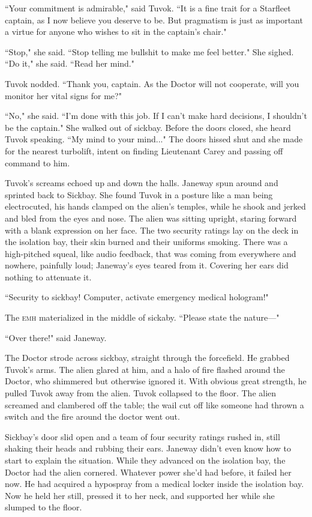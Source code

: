 \documentclass[twoside,letterpaper,12pt]{memoir}
\begin{document}
``Your commitment is admirable," said Tuvok. ``It is a fine trait for a Starfleet captain, as I now believe you deserve to be. But pragmatism is just as important a virtue for anyone who wishes to sit in the captain's chair." 

``Stop," she said. ``Stop telling me bullshit to make me feel better." She sighed. ``Do it," she said. ``Read her mind." 

Tuvok nodded. ``Thank you, captain. As the Doctor will not cooperate, will you monitor her vital signs for me?" 

``No," she said. ``I'm done with this job. If I can't make hard decisions, I shouldn't be the captain." She walked out of sickbay. Before the doors closed, she heard Tuvok speaking. ``My mind to your mind..." The doors hissed shut and she made for the nearest turbolift, intent on finding Lieutenant Carey and passing off command to him. 

Tuvok's screams echoed up and down the halls. Janeway spun around and sprinted back to Sickbay. She found Tuvok in a posture like a man being electrocuted, his hands clamped on the alien's temples, while he shook and jerked and bled from the eyes and nose. The alien was sitting upright, staring forward with a blank expression on her face. The two security ratings lay on the deck in the isolation bay, their skin burned and their uniforms smoking. There was a high-pitched squeal, like audio feedback, that was coming from everywhere and nowhere, painfully loud; Janeway's eyes teared from it. Covering her ears did nothing to attenuate it. 

``Security to sickbay! Computer, activate emergency medical hologram!" 

The \textsc{emh} materialized in the middle of sickaby. ``Please state the nature---" 

``Over there!" said Janeway. 

The Doctor strode across sickbay, straight through the forcefield. He grabbed Tuvok's arms. The alien glared at him, and a halo of fire flashed around the Doctor, who shimmered but otherwise ignored it. With obvious great strength, he pulled Tuvok away from the alien. Tuvok collapsed to the floor. The alien screamed and clambered off the table; the wail cut off like someone had thrown a switch and the fire around the doctor went out. 

Sickbay's door slid open and a team of four security ratings rushed in, still shaking their heads and rubbing their ears. Janeway didn't even know how to start to explain the situation. While they advanced on the isolation bay, the Doctor had the alien cornered. Whatever power she'd had before, it failed her now. He had acquired a hypospray from a medical locker inside the isolation bay. Now he held her still, pressed it to her neck, and supported her while she slumped to the floor. 
\end{document}
